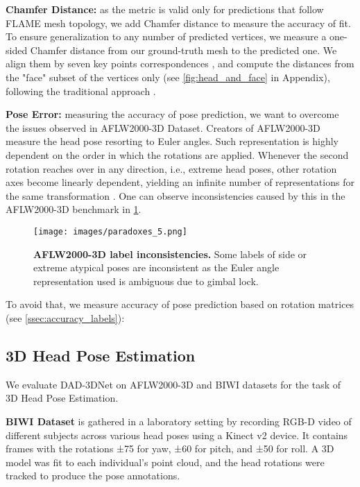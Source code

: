 \documentclass[10pt,twocolumn,letterpaper]{article}
\begin{document}
\textbf{Chamfer Distance:} as the  metric is valid only for predictions that follow FLAME mesh topology, we add Chamfer distance to measure the accuracy of fit. To ensure generalization to any number of predicted vertices, we measure a one-sided Chamfer distance from our ground-truth mesh to the predicted one. We align them by seven key points correspondences \cite{RingNet}, and compute the distances from the "face" subset of the vertices only (see \cref{fig:head_and_face} in Appendix), following the traditional approach \cite{RingNet, 3d-face-modeling-from-diverse-raw-scan-data}.

\textbf{Pose Error:} measuring the accuracy of pose prediction, we want to overcome the issues observed in AFLW2000-3D\cite{koestinger11a} Dataset. Creators of AFLW2000-3D measure the head pose resorting to Euler angles. Such representation is highly dependent on the order in which the rotations are applied. Whenever the second rotation reaches over  in any direction, i.e., extreme head poses, other rotation axes become linearly dependent, yielding an infinite number of representations for the same transformation \cite{eruler_rotation}.
One can observe inconsistencies caused by this in the AFLW2000-3D\cite{koestinger11a} benchmark in \cref{fig:paradox}.

\begin{figure}[t]\centering
\texttt{[image: images/paradoxes\_5.png]}

  \caption{\textbf{AFLW2000-3D label inconsistencies.} Some labels of side or extreme atypical poses are inconsistent as the Euler angle representation used is ambiguous due to gimbal lock.}
  \vspace{-1em}
  \label{fig:paradox}
\end{figure}


To avoid that, we measure accuracy of pose prediction based on rotation matrices \cite{rot_matrix_metrics} (see \cref{ssec:accuracy_labels}):\\



\subsection{3D Head Pose Estimation}\label{ssec:3d_head_pose_estimation}

We evaluate DAD-3DNet on AFLW2000-3D and BIWI datasets for the task of 3D Head Pose Estimation.

\textbf{BIWI Dataset} \cite{BIWI} is gathered in a laboratory setting by recording RGB-D video of different subjects across various head poses using a Kinect v2 device. 
It contains frames with the rotations ±75 for yaw, ±60 for pitch, and ±50 for roll. 
A 3D model was fit to each individual's point cloud, and the head rotations were tracked to produce the pose annotations. 
\end{document}

